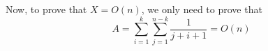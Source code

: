 \documentclass[11pt]{article}
\begin{document}
\begin{comment}
def check(n=10, k=4) :
	a = set()
	for i in range(k, n+1) :
		for j in range(i+1, n+1) :
			a.add((i, j))
	b = set()
	for j in range(k+1, n+1) :
		for i in range(k, j-1+1) :
			b.add((i, j))
	assert a == b
	return a, b
\end{comment}

Now, to prove that $X = O(n)$, we only need to prove that
 $$A = \sum_{i=1}^k{\sum_{j=1}^{n-k}{\displaystyle\frac{1}{j+i+1}}} = O(n)$$

\begin{comment}
Since the series does not always grow from $1$, we have to derive something
 similar to Equation A.10. %

(Note that $\lg$ has a base of $2$, as in Introduction to Algorithms). 

$$
\begin{aligned}
\sum_{k=m}^n{\frac{1}{k}}
& \le \sum_{i=\lfloor\lg{m}\rfloor}^{\lfloor\lg{n}\rfloor}{
			\sum_{j=0}^{2^i-1}{\frac{1}{2^i+j}}} \\
& \le \sum_{i=\lfloor\lg{m}\rfloor}^{\lfloor\lg{n}\rfloor}{
			\sum_{j=0}^{2^i-1}{\frac{1}{2^i}}} \\
& = \sum_{i=\lfloor\lg{m}\rfloor}^{\lfloor\lg{n}\rfloor}{1} \\
& \le \lg{n} - \lg{m} + 1
\end{aligned}
$$

So 
$$
\begin{aligned}
\sum_{i=1}^k{\sum_{j=1}^{n-k}{\displaystyle\frac{1}{j+i+1}}}
& \le \sum_{i=1}^k{\lg{(n-k+i+1)} - \lg{(i+2)} + 1} \\
& \le k + \sum_{i=1}^k{\lg{(n-k+i+1)} - \lg{(i+2)}} \\
& = k + \sum_{i=1}^k{\lg{(n-k+i+1)}} - \sum_{i=1}^k{\lg{(i+2)}} \\
& = k + \sum_{i=n-k+2}^{n+1}{\lg{i}} - \sum_{i=3}^{k+2}{\lg{i}} \\
\end{aligned}
$$

We have $k = O(n)$, and let
$$A = \sum_{i=n-k+2}^{n+1}{\lg{i}} - \sum_{i=3}^{k+2}{\lg{i}}$$

We need to prove that $A = O(n)$. We can consider whether the two summation
 have overlap items and split into two cases

Case 1: when $n - k > k$ (i.e. $k < n/2$), let $k' = k$, so
 $$A = \sum_{i=n-k'+2}^{n+1}{\lg{i}} - \sum_{i=3}^{k'+2}{\lg{i}}$$

Case 2: when $n - k \le k$ (i.e. $k \ge n/2$), let $k' = n - k$
 $$
 \begin{aligned}
 A & = \sum_{i=n-n+k'+2}^{n+1}{\lg{i}} - \sum_{i=3}^{n-k'+2}{\lg{i}} \\
	& = \sum_{i=k'+2}^{n+1}{\lg{i}} - \sum_{i=3}^{n-k'+2}{\lg{i}} \\
	& = \sum_{i=k'+2}^{n+1}{\lg{i}} - \sum_{i=k'+2}^{n-k'+2}{\lg{i}}
	 + \sum_{i=k'+2}^{n-k'+2}{\lg{i}} - \sum_{i=3}^{n-k'+2}{\lg{i}} \\
	& = \sum_{i=n-k'+2}^{n+1}{\lg{i}} - \sum_{i=3}^{k'+2}{\lg{i}} \\
 \end{aligned}
 $$


\end{comment}
\end{document}
